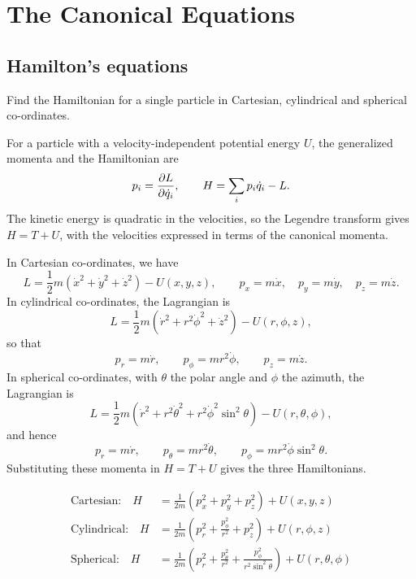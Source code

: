 \chapter{The Canonical Equations}

\section{Hamilton's equations}


\begin{problem}[title={Hamiltonian in three co-ordinate systems}]
{
Find the Hamiltonian for a single particle in Cartesian, cylindrical and spherical co-ordinates.
}
{
For a particle with a velocity-independent potential energy $U$, the generalized momenta and the Hamiltonian are
\begin{equation*}
    p_i = \frac{\partial L}{\partial \Dot{q}_i}, \qquad H = \sum_i p_i\Dot{q}_i - L.
\end{equation*}
The kinetic energy is quadratic in the velocities, so the Legendre transform gives $H = T + U$, with the velocities expressed in terms of the canonical momenta.

In Cartesian co-ordinates, we have
\begin{equation*}
    L = \frac{1}{2}m\left(\Dot{x}^2 + \Dot{y}^2 + \Dot{z}^2\right) - U(x, y, z), \qquad p_x = m\Dot{x}, \quad p_y = m\Dot{y}, \quad p_z = m\Dot{z}.
\end{equation*}
In cylindrical co-ordinates, the Lagrangian is
\begin{equation*}
    L = \frac{1}{2}m\left(\Dot{r}^2 + r^2\Dot{\phi}^2 + \Dot{z}^2\right) - U(r, \phi, z),
\end{equation*}
so that
\begin{equation*}
    p_r = m\Dot{r}, \qquad p_\phi = mr^2\Dot{\phi}, \qquad p_z = m\Dot{z}.
\end{equation*}
In spherical co-ordinates, with $\theta$ the polar angle and $\phi$ the azimuth, the Lagrangian is
\begin{equation*}
    L = \frac{1}{2}m\left(\Dot{r}^2 + r^2\Dot{\theta}^2 + r^2\Dot{\phi}^2\sin^2{\theta}\right) - U(r, \theta, \phi),
\end{equation*}
and hence
\begin{equation*}
    p_r = m\Dot{r}, \qquad p_\theta = mr^2\Dot{\theta}, \qquad p_\phi = mr^2\Dot{\phi}\sin^2{\theta}.
\end{equation*}
Substituting these momenta in $H = T + U$ gives the three Hamiltonians.
}
{
\begin{align*}
    \text{Cartesian:} \quad H &= \frac{1}{2m}\left(p_x^2 + p_y^2 + p_z^2\right) + U(x, y, z) \\
    \text{Cylindrical:} \quad H &= \frac{1}{2m}\left(p_r^2 + \frac{p_\phi^2}{r^2} + p_z^2\right) + U(r, \phi, z) \\
    \text{Spherical:} \quad H &= \frac{1}{2m}\left(p_r^2 + \frac{p_\theta^2}{r^2} + \frac{p_\phi^2}{r^2\sin^2{\theta}}\right) + U(r, \theta, \phi)
\end{align*}
}
\end{problem}

